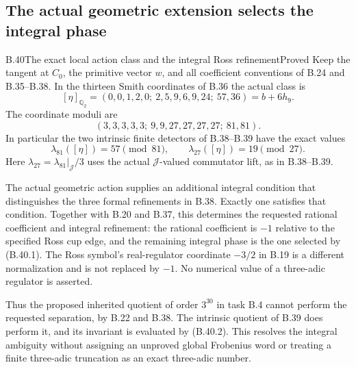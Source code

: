 \subsection{The actual geometric extension selects the integral phase}

\begin{statement}{B.40}{The exact local action class and the integral Ross refinement}{Proved}
Keep the tangent at $C_0$, the primitive vector $w$, and all
coefficient conventions of B.24 and B.35--B.38.
In the thirteen Smith coordinates of B.36 the actual class is
\[
 [\eta]_{\mathbb Q_2}
  =(0,0,1,2,0;\ 2,5,9,6,9,24;\ 57,36)
  =b+6h_9.                                                     \tag{B.40.1}
\]
The coordinate moduli are
\[
 (3,3,3,3,3;\ 9,9,27,27,27,27;\ 81,81).
\]
In particular the two intrinsic finite detectors of B.38--B.39
have the exact values
\[
          \lambda_{81}([\eta])=57\pmod {81},\qquad
          \lambda_{27}([\eta])=19\pmod {27}.                    \tag{B.40.2}
\]
Here $\lambda_{27}=\lambda_{81}|_{\mathcal J}/3$ uses the
actual $\mathcal J$-valued commutator lift, as in B.38--B.39.

The actual geometric action supplies an additional integral
condition that distinguishes the three formal refinements in
B.38. Exactly one satisfies that condition. Together with
B.20 and B.37, this determines the requested rational
coefficient and integral refinement: the rational coefficient
is $-1$ relative to the specified Ross cup edge, and the
remaining integral phase is the one selected by (B.40.1).
The Ross symbol's real-regulator coordinate $-3/2$ in B.19
is a different normalization and is not replaced by $-1$.
No numerical value of a three-adic regulator is asserted.

Thus the proposed inherited quotient of order $3^{30}$ in
task B.4 cannot perform the requested separation, by B.22
and B.38. The intrinsic quotient of B.39 does perform it,
and its invariant is evaluated by (B.40.2). This resolves
the integral ambiguity without assigning an unproved
global Frobenius word or treating a finite three-adic
truncation as an exact three-adic number.
\end{statement}
